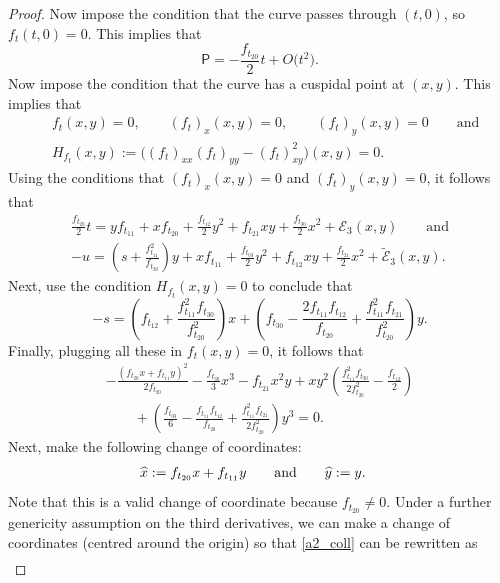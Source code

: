 \documentclass[pdftex]{sigma}
\numberwithin{equation}{section}
\begin{document}
\begin{proof}
Now impose the condition that the curve passes through $(t, 0)$, so $f_t(t, 0) = 0$.
This implies that
\[
\mathsf{P}  =  -\frac{f_{t_{20}}}{2}t + O\bigl(t^2\bigr).
\]
Now impose the condition that the curve has a cuspidal point at $(x, y)$. This implies that
\begin{align*}
&f_{t}(x, y)  = 0, \qquad (f_{t})_x(x, y) = 0, \qquad
(f_{t})_y(x, y)= 0  \qquad \text{and} \nonumber \\
&H_{f_t}(x,y) := \bigl((f_{t})_{xx} (f_{t})_{yy} - (f_{t})_{xy}^2\bigr)(x,y)= 0.
\end{align*}
Using the conditions that $(f_{t})_x(x,y) = 0$ and $(f_{t})_y(x,y) = 0$, it follows that
\begin{gather}%
\frac{f_{t_{20}}}{2} t  = yf_{t_{11}} +x f_{t_{20}} + \frac{f_{t_{12}}}{2} y^2 + f_{t_{21}} xy +
\frac{f_{t_{30}}}{2} x^2 +
\mathcal{E}_3(x, y) \qquad \text{and}\nonumber\\
-u  = \left(s+\frac{f_{t_{11}}^2}{f_{t_{20}}}\right) y + x f_{t_{11}} + \frac{f_{t_{03}}}{2} y^2 + f_{t_{12}} xy+ \frac{f_{t_{21}}}{2} x^2 +
\widetilde{\mathcal{E}}_3(x, y).\label{Hj1}
\end{gather}
Next, use the condition $H_{f_t}(x,y) = 0$ to conclude that
\[
-s = \left(f_{t_{12}} + \frac{f_{t_{11}}^2 f_{t_{30}}}{f_{t_{20}}^2} \right) x + \left(f_{t_{30}}
-\frac{2 f_{t_{11}} f_{t_{12}}}{f_{t_{20}}} + \frac{f_{t_{11}}^2 f_{t_{21}}}{f_{t_{20}}^2} \right) y.
\]
Finally, plugging all these in $f_t(x, y) = 0$, it follows that
\begin{gather}
-\frac{(f_{t_{20}}x + f_{t_{11}} y)^2}{2 f_{t_{20}}} - \frac{f_{t_{30}}}{3} x^3 -f_{t_{21}}x^2 y
+ xy^2 \left(\frac{f_{t_{11}}^2 f_{t_{30}}}{2 f_{t_{20}}^2} - \frac{f_{t_{12}}}{2}\right) \nonumber \\
\qquad+ \left( \frac{f_{t_{03}}}{6} - \frac{f_{t_{11}} f_{t_{12}}}{f_{t_{20}}}+
\frac{f_{t_{11}}^2 f_{t_{21}}}{2 f_{t_{20}}^2} \right) y^3 = 0. \label{a2_coll}
\end{gather}
Next, make the following change of coordinates:
\begin{align}
\widehat{x} & :=  f_{t_{20}}x + f_{t_{11}} y \qquad \textnormal{and} \qquad \widehat{y}
 :=  y. \label{hat_x_Hj3}
\end{align}
Note that this is a valid change of coordinate because $f_{t_{20}} \not= 0$.
Under a further genericity assumption on the third derivatives, we can make a change of coordinates
(centred around the origin) so that \eqref{a2_coll} can be rewritten as
\begin{align}\label{ez}

\end{align}
\end{proof}
\end{document}
